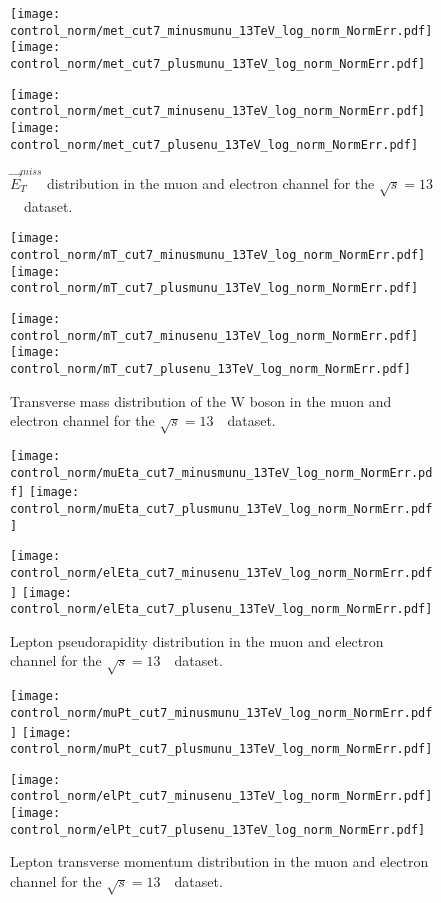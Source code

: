\begin{figure}[h]
	\centering
	{\texttt{[image: control\_norm/met\_cut7\_minusmunu\_13TeV\_log\_norm\_NormErr.pdf]}\label{f:}}
	{\texttt{[image: control\_norm/met\_cut7\_plusmunu\_13TeV\_log\_norm\_NormErr.pdf]}\label{f:}}
	
	{\texttt{[image: control\_norm/met\_cut7\_minusenu\_13TeV\_log\_norm\_NormErr.pdf]}\label{f:}}
	{\texttt{[image: control\_norm/met\_cut7\_plusenu\_13TeV\_log\_norm\_NormErr.pdf]}\label{f:}}
	\caption{ $\vec{E}^{miss}_{T}$ distribution in the muon and electron channel  for the $\sqrt{s} = 13$~\TeV\ dataset. }\end{figure}




\begin{figure}[h]
	\centering
	{\texttt{[image: control\_norm/mT\_cut7\_minusmunu\_13TeV\_log\_norm\_NormErr.pdf]}\label{f:}}
	{\texttt{[image: control\_norm/mT\_cut7\_plusmunu\_13TeV\_log\_norm\_NormErr.pdf]}\label{f:}}
	
	{\texttt{[image: control\_norm/mT\_cut7\_minusenu\_13TeV\_log\_norm\_NormErr.pdf]}\label{f:}}
	{\texttt{[image: control\_norm/mT\_cut7\_plusenu\_13TeV\_log\_norm\_NormErr.pdf]}\label{f:}}
	\caption{  Transverse mass distribution of the W boson in the muon and electron channel  for the $\sqrt{s} = 13$~\TeV\ dataset. }\end{figure}


\begin{figure}[h]
	\centering
	{\texttt{[image: control\_norm/muEta\_cut7\_minusmunu\_13TeV\_log\_norm\_NormErr.pdf]}\label{f:}}
	{\texttt{[image: control\_norm/muEta\_cut7\_plusmunu\_13TeV\_log\_norm\_NormErr.pdf]}\label{f:}}
	
	{\texttt{[image: control\_norm/elEta\_cut7\_minusenu\_13TeV\_log\_norm\_NormErr.pdf]}\label{f:}}
	{\texttt{[image: control\_norm/elEta\_cut7\_plusenu\_13TeV\_log\_norm\_NormErr.pdf]}\label{f:}}
	\caption{  Lepton pseudorapidity distribution in the muon and electron channel  for the $\sqrt{s} = 13$~\TeV\ dataset. }\end{figure}


\begin{figure}[h]
	\centering
	{\texttt{[image: control\_norm/muPt\_cut7\_minusmunu\_13TeV\_log\_norm\_NormErr.pdf]}\label{f:}}
	{\texttt{[image: control\_norm/muPt\_cut7\_plusmunu\_13TeV\_log\_norm\_NormErr.pdf]}\label{f:}}
	
	{\texttt{[image: control\_norm/elPt\_cut7\_minusenu\_13TeV\_log\_norm\_NormErr.pdf]}\label{f:}}
	{\texttt{[image: control\_norm/elPt\_cut7\_plusenu\_13TeV\_log\_norm\_NormErr.pdf]}\label{f:}}
	\caption{  Lepton transverse momentum distribution in the muon and electron channel  for the $\sqrt{s} = 13$~\TeV\ dataset. }\end{figure}



